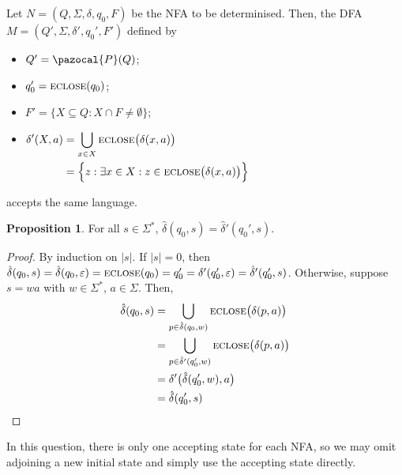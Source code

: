 \documentclass{article}
\theoremstyle{definition}
\newtheorem*{proposition}{Proposition}
\theoremstyle{definition}
\theoremstyle{remark}
\newcommand{\eclose}{\operatorname{\textsc{eclose}}}
\begin{document}
Let $N=(Q,\Sigma,\delta,q_0,F)$ be the NFA to be determinised. Then, the DFA $M=(Q',\Sigma,\delta',q_0',F')$ defined by
\begin{itemize}
    \item $Q'=\pazocal{P}(Q)$;
    \item $q_0'=\eclose(q_0)$;
    \item $F'=\{X\subseteq Q:X\cap F\neq\emptyset\}$;
    \item
    $\begin{aligned}[t]
        \delta'(X,a)&=\bigcup_{x\in X}\eclose\bigl(\delta(x,a)\bigr)\\
        &=\Bigl\{z:\exists x\in X: z\in\eclose\bigl(\delta(x,a)\bigr)\Bigr\}
    \end{aligned}$
\end{itemize}
accepts the same language.

\begin{proposition}
    For all $s\in\Sigma^\ast$, $\hat{\delta}(q_0,s)=\hat{\delta}'(q_0',s)$.
\end{proposition}
\begin{proof}
    By induction on $|s|$. If $|s|=0$, then $\hat{\delta}(q_0,s)=\hat{\delta}(q_0,\varepsilon)=\eclose(q_0)=q_0'=\delta'(q_0',\varepsilon)=\hat{\delta}'(q_0',s)$. Otherwise, suppose $s=wa$ with $w\in\Sigma^\ast$, $a\in\Sigma$. Then,
    \begin{align*}
        \hat{\delta}(q_0,s)&=\bigcup_{p\in\hat{\delta}(q_0,w)}\eclose\bigl(\delta(p,a)\bigr)\\
        &=\bigcup_{p\in\hat{\delta}'(q_0',w)}\eclose\bigl(\delta(p,a)\bigr)\\
        &=\delta'\bigl(\hat{\delta}(q_0',w),a\bigr)\\
        &=\hat{\delta}(q_0',s)\qedhere
    \end{align*}
\end{proof}


In this question, there is only one accepting state for each NFA, so we may omit adjoining a new initial state and simply use the accepting state directly.
\end{document}

